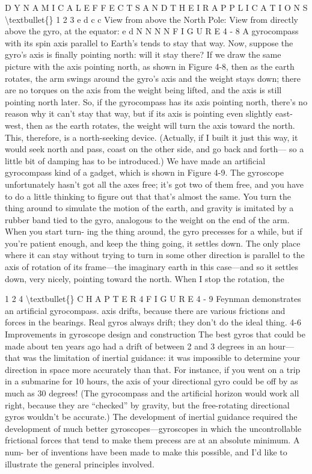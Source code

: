 \documentclass[10pt,oneside]{article}
\begin{document}
D Y N A M I C A L  E F F E C T S  A N D  T H E I R  A P P L I C A T I O N S \textbackslash{}textbullet\{\} 1 2 3 e d c c View from above the North Pole: View from directly above the gyro, at the equator: e d N N N N F I G U R E  4 - 8 A gyrocompass with its spin axis parallel to Earth’s tends to stay that way. Now, suppose the gyro’s axis is finally pointing north: will it stay there? If we draw the same picture with the axis pointing north, as shown in Figure 4-8, then as the earth rotates, the arm swings around the gyro’s axis and the weight stays down; there are no torques on the axis from the weight being lifted, and the axis is still pointing north later. So, if the gyrocompass has its axis pointing north, there’s no reason why it can’t stay that way, but if its axis is pointing even slightly east-west, then as the earth rotates, the weight will turn the axis toward the north. This, therefore, is a north-seeking device. (Actually, if I built it just this way, it would seek north and pass, coast on the other side, and go back and forth--- so a little bit of damping has to be introduced.) We have made an artificial gyrocompass kind of a gadget, which is shown in Figure 4-9. The gyroscope unfortunately hasn’t got all the axes free; it’s got two of them free, and you have to do a little thinking to figure out that that’s almost the same. You turn the thing around to simulate the motion of the earth, and gravity is imitated by a rubber band tied to the gyro, analogous to the weight on the end of the arm. When you start turn- ing the thing around, the gyro precesses for a while, but if you’re patient enough, and keep the thing going, it settles down. The only place where it can stay without trying to turn in some other direction is parallel to the axis of rotation of its frame---the imaginary earth in this case---and so it settles down, very nicely, pointing toward the north. When I stop the rotation, the\par

1 2 4 \textbackslash{}textbullet\{\} C H A P T E R  4 F I G U R E  4 - 9 Feynman demonstrates an artificial gyrocompass. axis drifts, because there are various frictions and forces in the bearings. Real gyros always drift; they don’t do the ideal thing. 4-6 Improvements in gyroscope design and construction The best gyros that could be made about ten years ago had a drift of between 2 and 3 degrees in an hour---that was the limitation of inertial guidance: it was impossible to determine your direction in space more accurately than that. For instance, if you went on a trip in a submarine for 10 hours, the axis of your directional gyro could be off by as much as 30 degrees! (The gyrocompass and the artificial horizon would work all right, because they are “checked” by gravity, but the free-rotating directional gyros wouldn’t be accurate.) The development of inertial guidance required the development of much better gyroscopes---gyroscopes in which the uncontrollable frictional forces that tend to make them precess are at an absolute minimum. A num- ber of inventions have been made to make this possible, and I’d like to illustrate the general principles involved.\par
\end{document}
